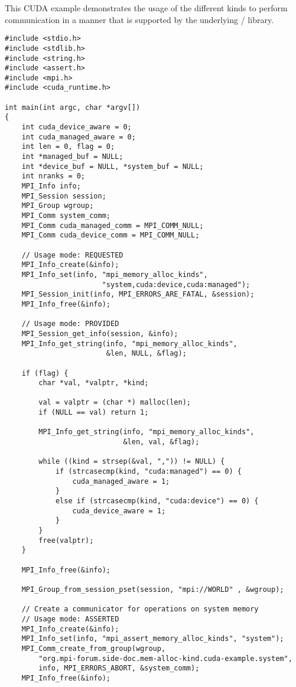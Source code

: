 \begin{example}
\label{example:alloc-kind-spm-cuda}
This CUDA example demonstrates the usage of the different
kinds to perform communication in a manner that is supported
by the underlying \mpi/ library.
\begin{lstlisting}[language={[MPI]C}]
#include <stdio.h>
#include <stdlib.h>
#include <string.h>
#include <assert.h>
#include <mpi.h>
#include <cuda_runtime.h>

int main(int argc, char *argv[])
{
    int cuda_device_aware = 0;
    int cuda_managed_aware = 0;
    int len = 0, flag = 0;
    int *managed_buf = NULL;
    int *device_buf = NULL, *system_buf = NULL;
    int nranks = 0;
    MPI_Info info;
    MPI_Session session;
    MPI_Group wgroup;
    MPI_Comm system_comm;
    MPI_Comm cuda_managed_comm = MPI_COMM_NULL;
    MPI_Comm cuda_device_comm = MPI_COMM_NULL;

    // Usage mode: REQUESTED
    MPI_Info_create(&info);
    MPI_Info_set(info, "mpi_memory_alloc_kinds",
                       "system,cuda:device,cuda:managed");
    MPI_Session_init(info, MPI_ERRORS_ARE_FATAL, &session);
    MPI_Info_free(&info);

    // Usage mode: PROVIDED
    MPI_Session_get_info(session, &info);
    MPI_Info_get_string(info, "mpi_memory_alloc_kinds",
                        &len, NULL, &flag);

    if (flag) {
        char *val, *valptr, *kind;

        val = valptr = (char *) malloc(len);
        if (NULL == val) return 1;

        MPI_Info_get_string(info, "mpi_memory_alloc_kinds",
                            &len, val, &flag);

        while ((kind = strsep(&val, ",")) != NULL) {
            if (strcasecmp(kind, "cuda:managed") == 0) {
                cuda_managed_aware = 1;
            }
            else if (strcasecmp(kind, "cuda:device") == 0) {
                cuda_device_aware = 1;
            }
        }
        free(valptr);
    }

    MPI_Info_free(&info);

    MPI_Group_from_session_pset(session, "mpi://WORLD" , &wgroup);

    // Create a communicator for operations on system memory
    // Usage mode: ASSERTED
    MPI_Info_create(&info);
    MPI_Info_set(info, "mpi_assert_memory_alloc_kinds", "system");
    MPI_Comm_create_from_group(wgroup,
        "org.mpi-forum.side-doc.mem-alloc-kind.cuda-example.system",
        info, MPI_ERRORS_ABORT, &system_comm);
    MPI_Info_free(&info);


\end{lstlisting}
\end{example}
